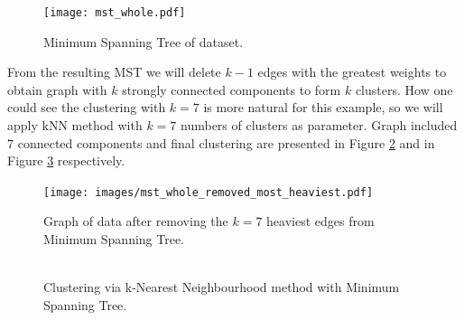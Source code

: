 {\begin{figure}[h]
	\centering
	\begin{minipage}[h]{0.1\linewidth}
\texttt{[image: mst\_whole.pdf]}
	\end{minipage}
	\caption{Minimum Spanning Tree of dataset.}
	\label{fig:mst_whole}	
\end{figure}	
	
	From the resulting MST we will delete $k-1$ edges with the greatest weights to obtain graph with $k$ strongly connected components to form $k$ clusters. How one could see the clustering with $k=7$ is more natural for this example, so we will apply kNN method with $k = 7$ numbers of clusters as parameter. Graph included $7$ connected components and final clustering are presented in Figure \ref{fig:mst_whole_removed_heaviest} and in Figure \ref{fig:mst_clusters_splitted} respectively.

\begin{figure}[h]
	\centering
	\begin{minipage}[h]{0.1\linewidth}
\texttt{[image: images/mst\_whole\_removed\_most\_heaviest.pdf]}
	\end{minipage}
	\caption{Graph of data after removing the $k=7$ heaviest edges from Minimum Spanning Tree.}
	\label{fig:mst_whole_removed_heaviest}	
\end{figure}	

\begin{figure}[h]
	\centering
	\begin{minipage}[h]{0.1\linewidth}
\includegraphics[width=\linewidth]{images/mst_clusters_splitted.pdf}
	\end{minipage}
	\caption{Clustering via k-Nearest Neighbourhood method with Minimum Spanning Tree.}
	\label{fig:mst_clusters_splitted}	
\end{figure}	

}
